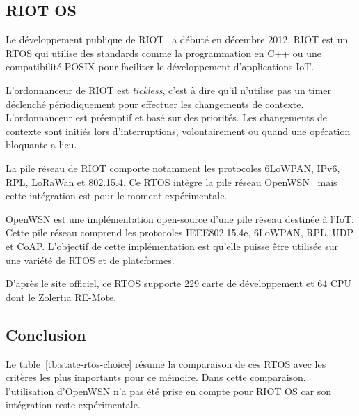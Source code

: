 \subsection*{RIOT OS}
    Le développement publique de RIOT~\cite{riotos} a débuté en décembre 2012\footnotemark[1].
    RIOT est un RTOS qui utilise des standards comme la programmation en C++ ou une compatibilité POSIX pour faciliter le développement d'applications IoT.

    L'ordonnanceur de RIOT est \textit{tickless}, c'est à dire qu'il n'utilise pas un timer déclenché périodiquement pour effectuer les changements de contexte. L'ordonnanceur est préemptif et basé sur des priorités. Les changements de contexte sont initiés lors d'interruptions, volontairement ou quand une opération bloquante a lieu. 

    La pile réseau de RIOT comporte notamment les protocoles 6LoWPAN, IPv6, RPL, LoRaWan et 802.15.4.
    Ce RTOS intègre la pile réseau OpenWSN~\cite{openwsn} mais cette intégration est pour le moment expérimentale.
    
    OpenWSN est une implémentation open-source d'une pile réseau destinée à l'IoT. Cette pile réseau comprend les protocoles IEEE802.15.4e, 6LoWPAN, RPL, UDP et CoAP. L'objectif de cette implémentation est qu'elle puisse être utilisée sur une variété de RTOS et de plateformes.

    D'après le site officiel, ce RTOS supporte 229 carte de développement et 64 CPU dont le Zolertia RE-Mote.


\subsection*{Conclusion}
Le table~\ref{tb:state-rtos-choice} résume la comparaison de ces RTOS avec les critères les plus importants pour ce mémoire. Dans cette comparaison, l'utilisation d'OpenWSN n'a pas été prise en compte pour RIOT OS car son intégration reste expérimentale.

